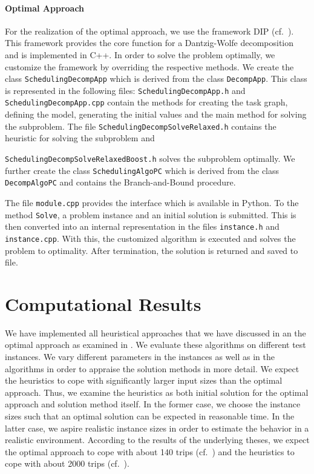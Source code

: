 \paragraph{Optimal Approach} \parfill

For the realization of the optimal approach, we use the framework DIP (cf.~\cite{DIP}). This framework provides the core function for a Dantzig-Wolfe decomposition and is implemented in C++. In order to solve the problem optimally, we customize the framework by overriding the respective methods. We create the class \texttt{SchedulingDecompApp} which is derived from the class \texttt{DecompApp}. This class is represented in the following files: \texttt{SchedulingDecompApp.h} and \texttt{SchedulingDecompApp.cpp} contain the methods for creating the task graph, defining the model, generating the initial values and the main method for solving the subproblem. The file \texttt{SchedulingDecompSolveRelaxed.h} contains the heuristic for solving the subproblem and\par
\texttt{SchedulingDecompSolveRelaxedBoost.h} solves the subproblem optimally. We further create the class \texttt{SchedulingAlgoPC} which is derived from the class \texttt{DecompAlgoPC} and contains the Branch-and-Bound procedure.

The file \texttt{module.cpp} provides the interface which is available in Python. To the method \texttt{Solve}, a problem instance and an initial solution is submitted. This is then converted into an internal representation in the files \texttt{instance.h} and \texttt{instance.cpp}. With this, the customized algorithm is executed and solves the problem to optimality. After termination, the solution is returned and saved to file.


\section{Computational Results}
\label{sec:computational_results}

We have implemented all heuristical approaches that we have discussed in  an the optimal approach as examined in . We evaluate these algorithms on different test instances. We vary different parameters in the instances as well as in the algorithms in order to appraise the solution methods in more detail. We expect the heuristics to cope with significantly larger input sizes than the optimal approach. Thus, we examine the heuristics as both initial solution for the optimal approach and solution method itself. In the former case, we choose the instance sizes such that an optimal solution can be expected in reasonable time. In the latter case, we aspire realistic instance sizes in order to estimate the behavior in a realistic environment. According to the results of the underlying theses, we expect the optimal approach to cope with about 140 trips (cf.~\cite[p.~139]{Kaiser}) and the heuristics to cope with about 2000 trips (cf.~\cite[p.~138]{Knoll}).

